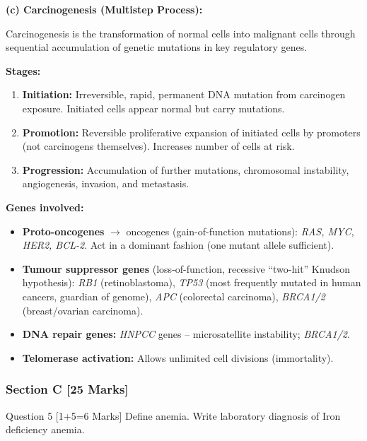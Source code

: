 \documentclass[11pt,a4paper]{article}
\begin{document}
\begin{ansbox}
\textbf{(c) Carcinogenesis (Multistep Process):}

Carcinogenesis is the transformation of normal cells into malignant cells through sequential accumulation of genetic mutations in key regulatory genes.

\textbf{Stages:}
\begin{enumerate}[leftmargin=*]
    \item \textbf{Initiation:} Irreversible, rapid, permanent DNA mutation from carcinogen exposure. Initiated cells appear normal but carry mutations.
    \item \textbf{Promotion:} Reversible proliferative expansion of initiated cells by promoters (not carcinogens themselves). Increases number of cells at risk.
    \item \textbf{Progression:} Accumulation of further mutations, chromosomal instability, angiogenesis, invasion, and metastasis.
\end{enumerate}

\textbf{Genes involved:}
\begin{itemize}[leftmargin=*]
    \item \textbf{Proto-oncogenes} $\rightarrow$ oncogenes (gain-of-function mutations): \textit{RAS, MYC, HER2, BCL-2}. Act in a dominant fashion (one mutant allele sufficient).
    \item \textbf{Tumour suppressor genes} (loss-of-function, recessive ``two-hit'' Knudson hypothesis): \textit{RB1} (retinoblastoma), \textit{TP53} (most frequently mutated in human cancers, guardian of genome), \textit{APC} (colorectal carcinoma), \textit{BRCA1/2} (breast/ovarian carcinoma).
    \item \textbf{DNA repair genes:} \textit{HNPCC} genes -- microsatellite instability; \textit{BRCA1/2}.
    \item \textbf{Telomerase activation:} Allows unlimited cell divisions (immortality).
\end{itemize}
\end{ansbox}

\subsubsection{Section C [25 Marks]}

\begin{qbox}{Question 5 [1+5=6 Marks]}
Define anemia. Write laboratory diagnosis of Iron deficiency anemia.
\end{qbox}
\end{document}
